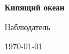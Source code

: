 \begin{titlepage}
  \centering
  \vspace*{2cm}
  {\LARGE\bfseries Кипящий океан\par}
  \vspace{0.8cm}
  {\Large Наблюдатель\par}
  \vfill
  {\large \today\par}
\end{titlepage}
\clearpage

\clearpage
\tableofcontents
\clearpage
